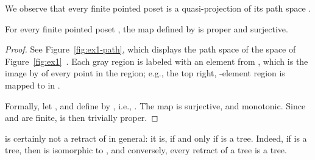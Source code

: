\documentclass{LMCS}
\begin{document}
We observe that every finite pointed poset  is a quasi-projection
of its path space .
\begin{lem}
  \label{lemma:path:qretr}
  For every finite pointed poset , the map 
  defined by  is proper and surjective.
\end{lem}
\begin{proof}
  See Figure~\ref{fig:ex1-path}, which displays the path space of the
  space  of Figure~\ref{fig:ex1}~.  Each gray region is
  labeled with an element from , which is the image by  of every
  point in the region; e.g., the top right, -element region is
  mapped to  in .

  Formally, let , and define  by , i.e., .  The map
   is surjective, and monotonic.  Since  and  are finite,  is
  then trivially proper.
\end{proof}
 is certainly not a retract of  in general: it is, if and
only if  is a tree.  Indeed, if  is a tree, then  is
isomorphic to , and conversely, every retract of a tree is a
tree.
\end{document}
